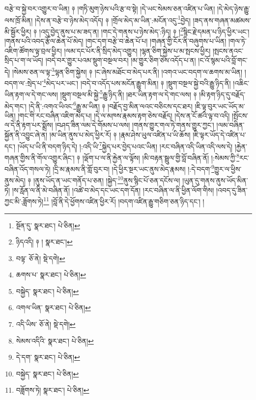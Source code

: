བརྩེ་བ་སྐྱེ་བར་འགྱུར་བ་ཡིན། ༈ །གཏི་མུག་ཉེས་པའི་རྩ་བ་སྟེ། །དེ་ཡང་སེམས་ཅན་འཛིན་པ་ཡིན། །དེ་མེད་ཉེས་རྒྱུ་ལས་ཁྲོ་མིན། །དེས་ན་བརྩེ་བ་ཉེས་མེད་འདོད། ༈ །གྲོལ་མེད་མ་ཡིན་:མངོན་འདུ་\footnote{སྔོན་དུ་  སྣར་ཐང་།  པེ་ཅིན། }བྱེད། །ཟད་ནས་གཞན་མཚམས་མི་སྦྱོར་ཕྱིར། ༈ །འདུ་བྱེད་ནུས་པ་མ་ཟད་ན། །གང་དེ་གནས་པ་ཉེས་མེད་:ཉིད། ༈ །\footnote{ཉིདའདི། ༈ །  སྣར་ཐང་། }སྙིང་རྗེ་དམན་པ་ཉིད་ཕྱིར་ཡང་། །གནས་པའི་འབད་རྩོལ་ཆེན་པོ་མེད། །གང་དག་བརྩེ་བ་ཆེན་པོ་པ། །གཞན་གྱི་ངོར་ནི་བཞུགས་པ་ཡིན། །གལ་ཏེ་འཇིག་ཚོགས་ལྟ་བྲལ་ཕྱིར། །ལམ་དང་པོར་ནི་སྲིད་མེད་འགྱུར། །ལྷན་ཅིག་སྐྱེས་པ་མ་སྤངས་ཕྱིར། །སྤངས་ནའང་སྲིད་པ་ག་ལ་ཡོད། །བདེ་བར་གྱུར་པའམ་སྡུག་བསྔལ་བར། །མ་གྱུར་ཅིག་ཅེས་འདོད་པ་ན། །ང་འོ་སྙམ་པའི་བློ་གང་དེ། །སེམས་ཅན་ལ་ལྟ་\footnote{བལྟ་  ཅོ་ནེ།  སྡེ་དགེ། }ལྷན་ཅིག་སྐྱེས། ༈ །ང་ཞེས་མཐོང་བ་མེད་པར་ནི། །འགའ་ཡང་བདག་ལ་ཆགས་མ་ཡིན། །བདག་ལ་:སྲེད་པ་\footnote{ཆགས་པ་  སྣར་ཐང་།  པེ་ཅིན། }མེད་པར་ཡང་། །བདེ་བ་འདོད་པས་མངོན་རྒྱུག་མིན། ༈ །སྡུག་བསྔལ་སྐྱེ་བའི་རྒྱུ་ཉིད་ནི། །འཆིང་ཡིན་རྟག་ལ་དེ་གང་ལས། །སྡུག་བསྔལ་མི་སྐྱེ་\footnote{བསྐྱེད་  སྣར་ཐང་།  པེ་ཅིན། }རྒྱུ་ཉིད་ནི། །ཐར་ཡིན་རྟག་ལ་དེ་གང་ལས། ༈ །མི་རྟག་ཉིད་དུ་བརྗོད་མེད་གང་། །དེ་ནི་:འགའ་ཡིའང་\footnote{འགལ་ཡིན་  སྣར་ཐང་།  པེ་ཅིན། }རྒྱུ་མ་ཡིན། ༈ །བརྗོད་བྱ་མིན་ལའང་བཅིངས་དང་ཐར། །ཇི་ལྟ་བུར་ཡང་ཡོད་མ་ཡིན། །གང་གི་རང་བཞིན་འཇིག་མེད་པ། །དེ་ལ་མཁས་རྣམས་རྟག་ཅེས་བརྗོད། །དེས་ན་ངོ་ཚའི་ལྟ་བ་འདི། །སྤོངས་ལ་དེ་ནི་རྟག་པར་སྨྲོས། །བཤད་ཟིན་ལམ་དེ་གོམས་པ་ལས། །གནས་གྱུར་གལ་ཏེ་གནས་གྱུར་ཀྱང་། །ལམ་བཞིན་སྐྱོན་ནི་འབྱུང་ཞེ་ན། །མ་ཡིན་ནུས་པ་མེད་ཕྱིར་རོ། ༈ །རྣམ་ཤེས་ཡུལ་འཛིན་པ་ཡི་ཆོས། །ཇི་ལྟར་ཡོད་དེ་འཛིན་པ་དང་། །ཡོད་པ་ཡི་ནི་བདག་ཉིད་དེ། །:འདི་ཡི་\footnote{འདི་ཡིས་  ཅོ་ནེ།  སྡེ་དགེ། }སྐྱེད་པར་བྱེད་པའང་ཡིན། །རང་བཞིན་འདི་ཡིན་འདི་ལས་དེ། །རྐྱེན་གཞན་གྱིས་ནི་གོལ་འགྱུར་ཞིང་། ༈ །ལྡོག་པ་ལ་ནི་རྐྱེན་ལ་ལྟོས། །མི་བརྟན་སྦྲུལ་གྱི་བློ་བཞིན་ནོ། །:སེམས་ཀྱི་\footnote{སེམས་འདིའི་  སྣར་ཐང་།  པེ་ཅིན། }རང་བཞིན་འོད་གསལ་ཏེ། །དྲི་མ་རྣམས་ནི་གློ་བུར་བ། །དེ་ཕྱིར་སྔར་ཡང་ནུས་མེད་རྣམས། །:དེ་བདག་\footnote{དེ་དག་  སྣར་ཐང་།  པེ་ཅིན། }གྱུར་ལ་ཕྱིས་ནུས་མེད། ༈ །ནུས་ཡོད་ན་ཡང་གནོད་པ་ཅན། །སྐྱེད་\footnote{བསྐྱེད་  སྣར་ཐང་།  པེ་ཅིན། }ནུས་སྙིང་པོ་ཅན་དངོས་ལ། །ཡུན་དུ་གནས་ནུས་ཡོད་མིན་ཏེ། །ས་རློན་ལ་ནི་མེ་བཞིན་ནོ། །འཚེ་བ་མེད་དང་ཡང་དག་དོན། །རང་བཞིན་ལ་ནི་ཕྱིན་ལོག་གིས། །འབད་དུ་ཟིན་ཀྱང་མི་:ཟློགས་ཏེ།\footnote{བཟློགས་ཏེ།  སྣར་ཐང་།  པེ་ཅིན། } །བློ་ནི་དེ་ཕྱོགས་འཛིན་ཕྱིར་རོ། །བདག་འཛིན་རྒྱུ་གཅིག་ཅན་ཉིད་དང་། །
